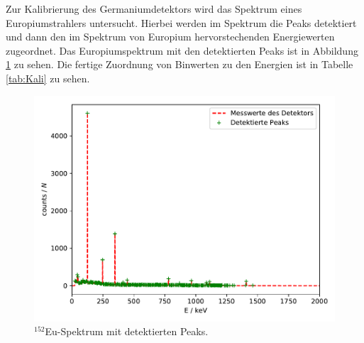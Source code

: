 Zur Kalibrierung des Germaniumdetektors wird das Spektrum eines Europiumstrahlers untersucht. Hierbei werden im Spektrum die Peaks detektiert und dann den im Spektrum von Europium hervorstechenden Energiewerten zugeordnet. Das Europiumspektrum mit den detektierten Peaks ist in Abbildung \ref{abb:Europiumspektrum} zu sehen. Die fertige Zuordnung von Binwerten zu den Energien ist in Tabelle \ref{tab:Kali} zu sehen.
\FloatBarrier
\begin{figure}
    \centering
    \includegraphics[scale=0.7]{Detektormesswerte.pdf}
    \caption{$^{152}$Eu-Spektrum mit detektierten Peaks.}
    \label{abb:Europiumspektrum}
\end{figure}
\FloatBarrier


